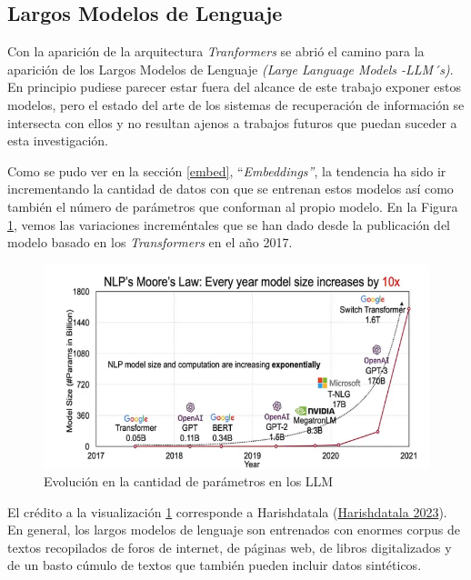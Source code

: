 \documentclass[
  12pt,
  openany]{book}
\begin{document}
\hypertarget{LLM}{%
\subsection{Largos Modelos de Lenguaje}\label{LLM}}

Con la aparición de la arquitectura \emph{Tranformers} se abrió el camino para la aparición de los Largos Modelos de Lenguaje \emph{(Large Language Models -LLM´s)}. En principio pudiese parecer estar fuera del alcance de este trabajo exponer estos modelos, pero el estado del arte de los sistemas de recuperación de información se intersecta con ellos y no resultan ajenos a trabajos futuros que puedan suceder a esta investigación.

Como se pudo ver en la sección \ref{embed}, ``\emph{Embeddings''}, la tendencia ha sido ir incrementando la cantidad de datos con que se entrenan estos modelos así como también el número de parámetros que conforman al propio modelo. En la Figura \ref{fig:llm}, vemos las variaciones increméntales que se han dado desde la publicación del modelo basado en los \emph{Transformers} en el año 2017.

\begin{figure}

{\centering \includegraphics[width=0.85\linewidth]{images/03-marco-teorico/llms} 

}

\caption{Evolución en la cantidad de parámetros en los LLM}\label{fig:llm}
\end{figure}

El crédito a la visualización \ref{fig:llm} corresponde a Harishdatala (\protect\hyperlink{ref-llmsize}{Harishdatala 2023}). En general, los largos modelos de lenguaje son entrenados con enormes corpus de textos recopilados de foros de internet, de páginas web, de libros digitalizados y de un basto cúmulo de textos que también pueden incluir datos sintéticos.
\end{document}
